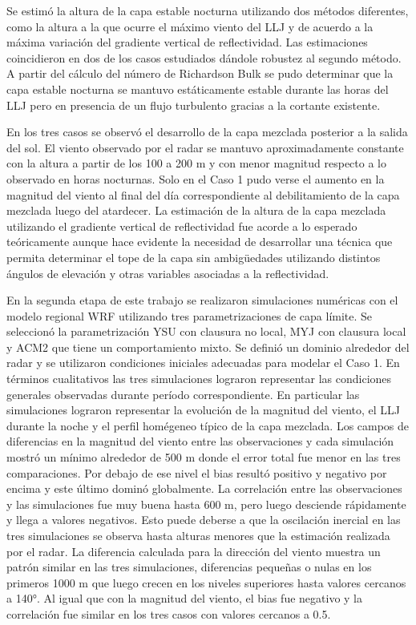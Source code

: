 \documentclass[12pt,spanish,oneside, a4paper]{book}
\begin{document}
Se estimó la altura de la capa estable nocturna utilizando dos métodos
diferentes, como la altura a la que ocurre el máximo viento del LLJ y de
acuerdo a la máxima variación del gradiente vertical de reflectividad.
Las estimaciones coincidieron en dos de los casos estudiados dándole
robustez al segundo método. A partir del cálculo del número de
Richardson Bulk se pudo determinar que la capa estable nocturna se
mantuvo estáticamente estable durante las horas del LLJ pero en
presencia de un flujo turbulento gracias a la cortante existente.

En los tres casos se observó el desarrollo de la capa mezclada posterior
a la salida del sol. El viento observado por el radar se mantuvo
aproximadamente constante con la altura a partir de los 100 a 200 m y
con menor magnitud respecto a lo observado en horas nocturnas. Solo en
el Caso 1 pudo verse el aumento en la magnitud del viento al final del
día correspondiente al debilitamiento de la capa mezclada luego del
atardecer. La estimación de la altura de la capa mezclada utilizando el
gradiente vertical de reflectividad fue acorde a lo esperado
teóricamente aunque hace evidente la necesidad de desarrollar una
técnica que permita determinar el tope de la capa sin ambigüedades
utilizando distintos ángulos de elevación y otras variables asociadas a
la reflectividad.

En la segunda etapa de este trabajo se realizaron simulaciones numéricas
con el modelo regional WRF utilizando tres parametrizaciones de capa
límite. Se seleccionó la parametrización YSU con clausura no local, MYJ
con clausura local y ACM2 que tiene un comportamiento mixto. Se definió
un dominio alrededor del radar y se utilizaron condiciones iniciales
adecuadas para modelar el Caso 1. En términos cualitativos las tres
simulaciones lograron representar las condiciones generales observadas
durante período correspondiente. En particular las simulaciones lograron
representar la evolución de la magnitud del viento, el LLJ durante la
noche y el perfil homégeneo típico de la capa mezclada. Los campos de
diferencias en la magnitud del viento entre las observaciones y cada
simulación mostró un mínimo alrededor de 500 m donde el error total fue
menor en las tres comparaciones. Por debajo de ese nivel el bias resultó
positivo y negativo por encima y este último dominó globalmente. La
correlación entre las observaciones y las simulaciones fue muy buena
hasta 600 m, pero luego desciende rápidamente y llega a valores
negativos. Esto puede deberse a que la oscilación inercial en las tres
simulaciones se observa hasta alturas menores que la estimación
realizada por el radar. La diferencia calculada para la dirección del
viento muestra un patrón similar en las tres simulaciones, diferencias
pequeñas o nulas en los primeros 1000 m que luego crecen en los niveles
superiores hasta valores cercanos a 140°. Al igual que con la magnitud
del viento, el bias fue negativo y la correlación fue similar en los
tres casos con valores cercanos a 0.5.
\end{document}
